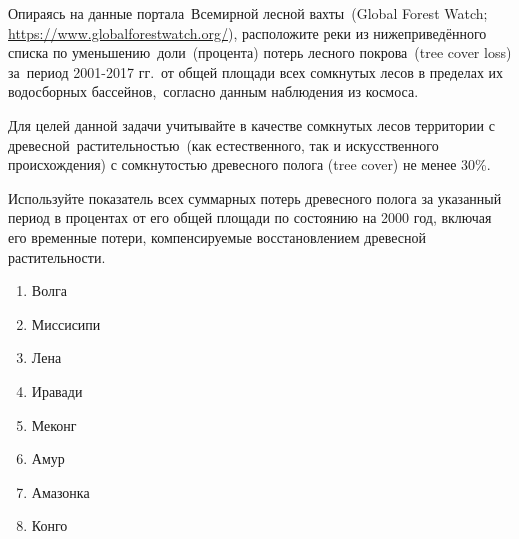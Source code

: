 
Опираясь на данные портала Всемирной лесной вахты (Global Forest Watch; \url{https://www.globalforestwatch.org/}), расположите реки из нижеприведённого списка по уменьшению доли (процента) потерь лесного покрова (tree cover loss) за период 2001-2017 гг. от общей площади всех сомкнутых лесов в пределах их водосборных бассейнов, согласно данным наблюдения из космоса.

Для целей данной задачи учитывайте в качестве сомкнутых лесов территории с древесной растительностью (как естественного, так и искусственного происхождения) с сомкнутостью древесного полога (tree cover) не менее 30\%.

Используйте показатель всех суммарных потерь древесного полога за указанный период в процентах от его общей площади по состоянию на 2000 год, включая его временные потери, компенсируемые восстановлением древесной растительности.

\begin{enumerate}
    \item Волга
    \item Миссисипи
    \item Лена
    \item Иравади
    \item Меконг
    \item Амур
    \item Амазонка
    \item Конго
\end{enumerate}

